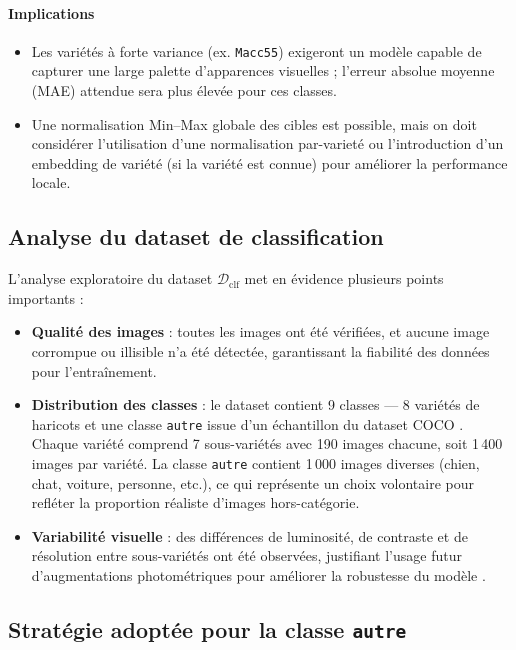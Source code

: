 \paragraph{Implications}
\begin{itemize}
	\item Les variétés à forte variance (ex. \texttt{Macc55}) exigeront un modèle capable de capturer une large palette d'apparences visuelles ; l'erreur absolue moyenne (MAE) attendue sera plus élevée pour ces classes.
	\item Une normalisation Min--Max globale des cibles est possible, mais on doit considérer l'utilisation d'une normalisation par-varieté ou l'introduction d'un embedding de variété (si la variété est connue) pour améliorer la performance locale.
\end{itemize}

\subsection{Analyse du dataset de classification}

L'analyse exploratoire du dataset \(\mathcal{D}_{\text{clf}}\) met en évidence plusieurs points importants :

\begin{itemize}
	\item \textbf{Qualité des images} : toutes les images ont été vérifiées, et aucune image corrompue ou illisible n’a été détectée, garantissant la fiabilité des données pour l’entraînement.
	\item \textbf{Distribution des classes} : le dataset contient 9 classes — 8 variétés de haricots et une classe \texttt{autre} issue d’un échantillon du dataset COCO \cite{lin2014microsoft}. Chaque variété comprend 7 sous-variétés avec 190 images chacune, soit 1 400 images par variété. La classe \texttt{autre} contient 1 000 images diverses (chien, chat, voiture, personne, etc.), ce qui représente un choix volontaire pour refléter la proportion réaliste d’images hors-catégorie.
	\item \textbf{Variabilité visuelle} : des différences de luminosité, de contraste et de résolution entre sous-variétés ont été observées, justifiant l’usage futur d’augmentations photométriques pour améliorer la robustesse du modèle \cite{shorten2019survey}.
\end{itemize}

\subsection{Stratégie adoptée pour la classe \texttt{autre}}

